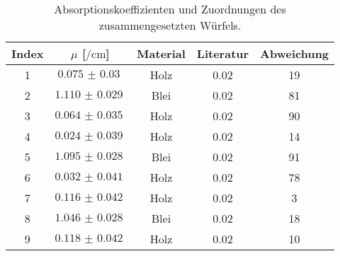 \begin{table}
    \centering
    \caption{Absorptionskoeffizienten und Zuordnungen des zusammengesetzten Würfels.}
    \label{tab:wurfel4}
    \begin{tabular}{c c c c c}
      \toprule
      {Index} & $\mu$ [$\si{\per\centi\meter}$] & {Material}
                & Literatur & Abweichung\\
      \midrule
       1 & $\SI{0.075(30)}{}$ & Holz  & 0.02 & 19  \\
       2 & $\SI{1.110(29)}{}$ & Blei  &   0.02& 81  \\
       3 & $\SI{0.064(35)}{}$ & Holz  &   0.02& 90  \\
       4 & $\SI{0.024(39)}{}$ & Holz  & 0.02 & 14  \\
       5 & $\SI{1.095(28)}{}$ & Blei  &   0.02& 91  \\
       6 & $\SI{0.032(41)}{}$ & Holz  &   0.02& 78  \\
       7 & $\SI{0.116(42)}{}$ & Holz  & 0.02 &  3  \\
       8 & $\SI{1.046(28)}{}$ & Blei  & 0.02 & 18  \\
       9 & $\SI{0.118(42)}{}$ & Holz  & 0.02 & 10  \\
      \bottomrule
    \end{tabular}
\end{table}
